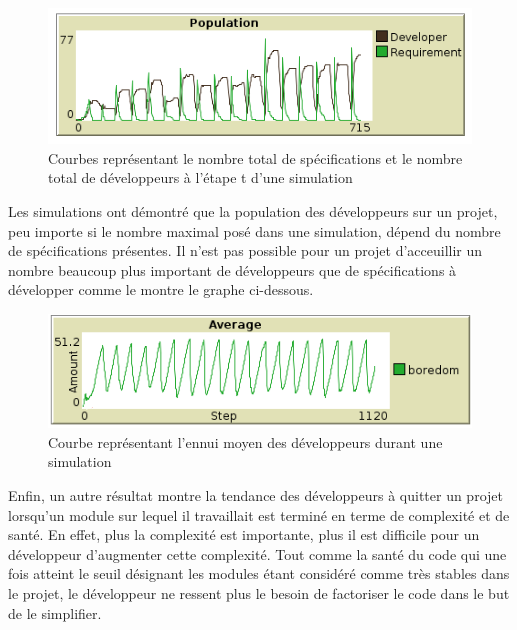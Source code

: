 \documentclass{article}
\begin{document}
\begin{figure}[H]
  \centerline{\includegraphics[scale=1]{pictures/popu_requirement.png}}
  \caption{Courbes représentant le nombre total de spécifications et le nombre total de développeurs à l'étape t d'une simulation}
\end{figure}
Les simulations ont démontré que la population des développeurs sur un projet, peu importe si le nombre maximal posé dans une simulation, dépend du nombre
de spécifications présentes. Il n'est pas possible pour un projet d'acceuillir un nombre beaucoup plus important de développeurs que de spécifications à développer comme le montre le graphe ci-dessous.


\begin{figure}[H]
  \centerline{\includegraphics[scale=1]{pictures/sinusoide_ennui.png}}
  \caption{Courbe représentant l'ennui moyen des développeurs durant une simulation}
\end{figure}

Enfin, un autre résultat montre la tendance des développeurs à quitter un projet lorsqu'un module sur lequel il travaillait est terminé en terme de complexité et de santé. En effet, plus la complexité est importante, plus il est difficile pour un développeur d'augmenter cette complexité. Tout comme la santé du code qui une fois atteint le seuil désignant les modules étant considéré comme très stables dans le projet, le développeur ne ressent plus le besoin de factoriser le code dans le but de le simplifier.

\newpage
\end{document}
